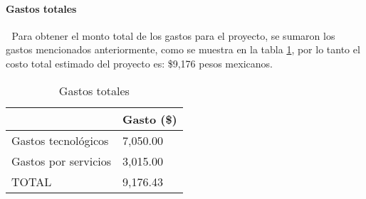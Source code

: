 \paragraph{Gastos totales} \textcolor{White}{.} \newline
Para obtener el monto total de los gastos para el proyecto, se sumaron los gastos mencionados anteriormente, como se muestra en la tabla \ref{disenoEstructura:gastosTotales}, por lo tanto el costo total estimado del proyecto es: \$9,176  pesos mexicanos.

\begin{table}[htbp]
	\begin{center}
		\begin{tabular}{|p{4cm}|p{4cm}|}
			\hline
			\thead{Concepto}&\thead{Gasto\\(\$)}\\
			\hline
			\hline
			Gastos tecnológicos &  7,050.00\\
			\hline
			Gastos por servicios & 3,015.00\\
			\hline
			\hline
			TOTAL & 9,176.43\\
			\hline
		\end{tabular}
		\caption{Gastos totales}
		\label{disenoEstructura:gastosTotales}
	\end{center}
\end{table}
  


